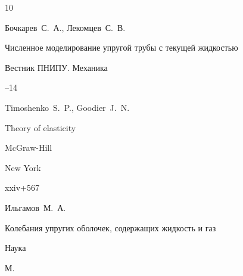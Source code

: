 \begin{thebibliography}{10}

\by Бочкарев~С.~А., Лекомцев~С.~В.

\paper Численное моделирование упругой трубы с текущей жидкостью

\jour Вестник ПНИПУ. Механика



--14













\by Timoshenko~S.~P., Goodier~J.~N.

\book Theory of elasticity


\publ McGraw-Hill

\publaddr New York

\totalpages xxiv+567




\by Ильгамов~М.~А.

\book Колебания упругих оболочек, содержащих жидкость и газ


\publ Наука

\publaddr М.










\end{thebibliography}
